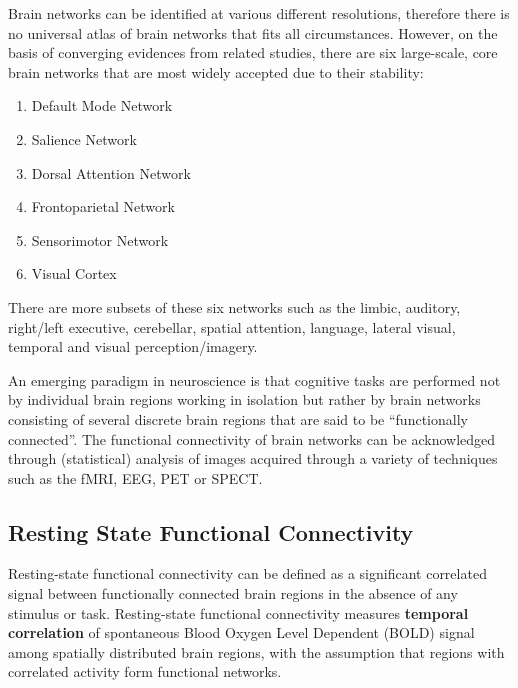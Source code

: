 \documentclass{article}
\begin{document}
Brain networks can be identified at various different resolutions,
therefore there is no universal atlas of brain networks that fits all
circumstances. However, on the basis of converging evidences from
related studies, there are six large-scale, core brain networks that
are most widely accepted due to their stability:

\begin{enumerate}[nosep]
  \item Default Mode Network
  \item Salience Network
  \item Dorsal Attention Network
  \item Frontoparietal Network
  \item Sensorimotor Network
  \item Visual Cortex
\end{enumerate}

There are more subsets of these six networks such as the limbic,
auditory, right/left executive, cerebellar, spatial attention,
language, lateral visual, temporal and visual perception/imagery.

An emerging paradigm in neuroscience is that cognitive tasks are
performed not by individual brain regions working in isolation but
rather by brain networks consisting of several discrete brain regions
that are said to be ``functionally connected''. The functional
connectivity of brain networks can be acknowledged through
(statistical) analysis of images acquired through a variety of
techniques such as the fMRI, EEG, PET or SPECT.


\subsection{Resting State Functional Connectivity}

Resting-state functional connectivity can be defined as a %
significant correlated signal between functionally connected brain
regions in the absence of any stimulus or task. Resting-state
functional connectivity measures \textbf{temporal correlation} of
spontaneous Blood Oxygen Level Dependent (BOLD) signal among spatially
distributed brain regions, with the assumption that regions with
correlated activity form functional networks.
\end{document}
